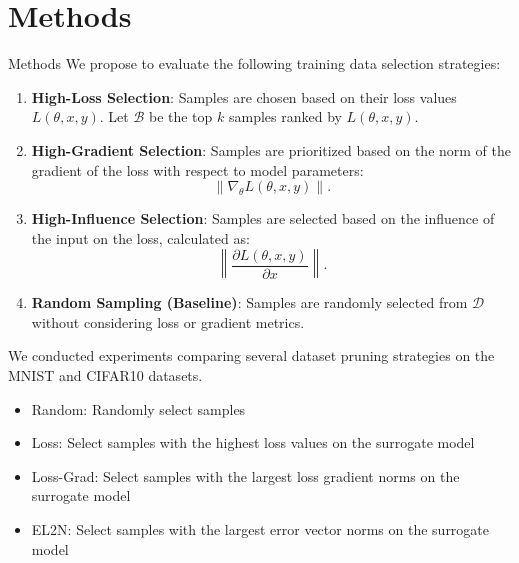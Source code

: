 \documentclass{ctexbeamer}
\begin{document}
\section{Methods}
\begin{frame}[allowframebreaks]{Methods}
    We propose to evaluate the following training data selection strategies:
    \begin{enumerate}
        \item \textbf{High-Loss Selection}\cite{Loss}: Samples are chosen based on their loss values $L(\theta, x, y)$. Let $\mathcal{B}$ be the top $k$ samples ranked by $L(\theta, x, y)$.
        \item \textbf{High-Gradient Selection}\cite{Gradient}: Samples are prioritized based on the norm of the gradient of the loss with respect to model parameters:
        \[\|\nabla_\theta L(\theta, x, y)\|.\]
        \item \textbf{High-Influence Selection}\cite{Influence}: Samples are selected based on the influence of the input on the loss, calculated as:
        \[\left\|\frac{\partial L(\theta, x, y)}{\partial x}\right\|.\]
        \item \textbf{Random Sampling (Baseline)}: Samples are randomly selected from $\mathcal{D}$ without considering loss or gradient metrics.
    \end{enumerate}

    We conducted experiments comparing several dataset pruning strategies on the MNIST and CIFAR10 datasets.
    \begin{itemize}
        \item Random: Randomly select samples
        \item Loss: Select samples with the highest loss values on the surrogate model
        \item Loss-Grad: Select samples with the largest loss gradient norms on the surrogate model
        \item EL2N\cite{paul2021deep}: Select samples with the largest error vector norms on the surrogate model
    \end{itemize}
\end{frame}
\end{document}
